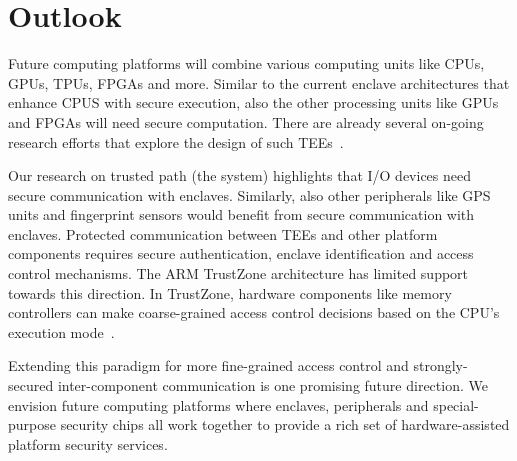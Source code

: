 
\section*{Outlook}



Future computing platforms will combine various computing units like CPUs, GPUs, TPUs, FPGAs and more. %
Similar to the current enclave architectures that enhance CPUS with secure execution, also the other processing units like GPUs and FPGAs will need secure computation. There are already several on-going research efforts that explore the design of such TEEs~\cite{volos2018graviton}.

Our research on trusted path (the \protection system) highlights that I/O devices need secure communication with enclaves. Similarly, also other peripherals like GPS units and fingerprint sensors would benefit from secure communication with enclaves. Protected communication between TEEs and other platform components requires secure authentication, enclave identification and access control mechanisms. The ARM TrustZone architecture has limited support towards this direction. In TrustZone, hardware components like memory controllers can make coarse-grained access control decisions based on the CPU's execution mode~\cite{ekberg2014untapped}. 


Extending this paradigm for more fine-grained access control and strongly-secured inter-component communication is one promising future direction. We envision future computing platforms where enclaves, peripherals and special-purpose security chips all work together to provide a rich set of hardware-assisted platform security services.
